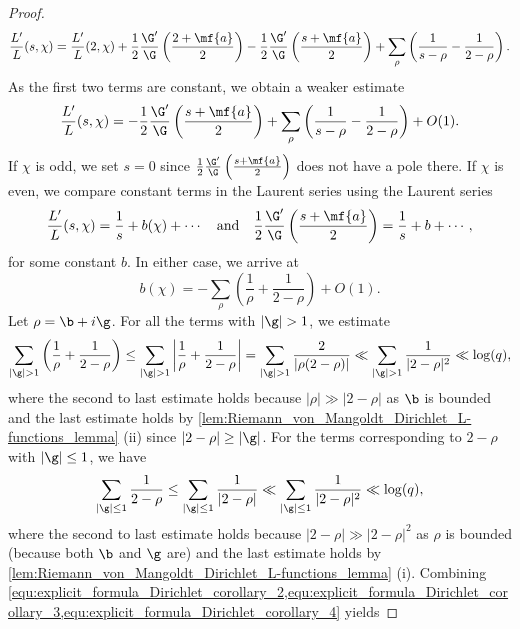 \begin{proof}
        \[
          \frac{L'}{L}(s,\chi) = \frac{L'}{L}(2,\chi)+\frac{1}{2}\frac{\G'}{\G}\left(\frac{2+\mf{a}}{2}\right)-\frac{1}{2}\frac{\G'}{\G}\left(\frac{s+\mf{a}}{2}\right)+\sum_{\rho}\left(\frac{1}{s-\rho}-\frac{1}{2-\rho}\right).
        \]
        As the first two terms are constant, we obtain a weaker estimate
        \[
          \frac{L'}{L}(s,\chi) = -\frac{1}{2}\frac{\G'}{\G}\left(\frac{s+\mf{a}}{2}\right)+\sum_{\rho}\left(\frac{1}{s-\rho}-\frac{1}{2-\rho}\right)+O(1).
        \]
        If $\chi$ is odd, we set $s = 0$ since $\frac{1}{2}\frac{\G'}{\G}\left(\frac{s+\mf{a}}{2}\right)$ does not have a pole there. If $\chi$ is even, we compare constant terms in the Laurent series using the Laurent series
        \[
          \frac{L'}{L}(s,\chi) = \frac{1}{s}+b(\chi)+\cdots \quad \text{and} \quad \frac{1}{2}\frac{\G'}{\G}\left(\frac{s+\mf{a}}{2}\right) = \frac{1}{s}+b+\cdots,
        \]
        for some constant $b$. In either case, we arrive at
        \begin{equation}\label{equ:explicit_formula_Dirichlet_corollary_2}
          b(\chi) = -\sum_{\rho}\left(\frac{1}{\rho}+\frac{1}{2-\rho}\right)+O(1).
        \end{equation}
        Let $\rho = \b+i\g$. For all the terms with $|\g| > 1$, we estimate
        \begin{equation}\label{equ:explicit_formula_Dirichlet_corollary_3}
          \sum_{|\g| > 1}\left(\frac{1}{\rho}+\frac{1}{2-\rho}\right) \le \sum_{|\g| > 1}\left|\frac{1}{\rho}+\frac{1}{2-\rho}\right| = \sum_{|\g| > 1}\frac{2}{|\rho(2-\rho)|} \ll \sum_{|\g| > 1}\frac{1}{|2-\rho|^{2}} \ll \log(q),
        \end{equation}
        where the second to last estimate holds because $|\rho| \gg |2-\rho|$ as $\b$ is bounded and the last estimate holds by \cref{lem:Riemann_von_Mangoldt_Dirichlet_L-functions_lemma} (ii) since $|2-\rho| \ge |\g|$. For the terms corresponding to $2-\rho$ with $|\g| \le 1$, we have
        \begin{equation}\label{equ:explicit_formula_Dirichlet_corollary_4}
          \sum_{|\g| \le 1}\frac{1}{2-\rho} \le \sum_{|\g| \le 1}\frac{1}{|2-\rho|} \ll \sum_{|\g| \le 1}\frac{1}{|2-\rho|^{2}} \ll \log(q),
        \end{equation}
        where the second to last estimate holds because $|2-\rho| \gg |2-\rho|^{2}$ as $\rho$ is bounded (because both $\b$ and $\g$ are) and the last estimate holds by \cref{lem:Riemann_von_Mangoldt_Dirichlet_L-functions_lemma} (i). Combining \cref{equ:explicit_formula_Dirichlet_corollary_2,equ:explicit_formula_Dirichlet_corollary_3,equ:explicit_formula_Dirichlet_corollary_4} yields

\end{proof}
